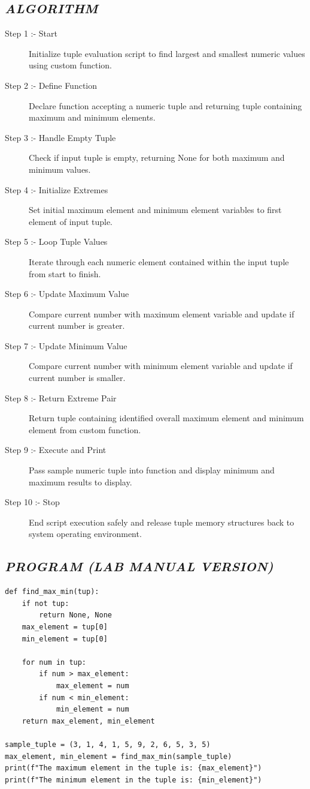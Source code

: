\documentclass[11pt,a4paper]{article}
\begin{document}
\subsection*{\textit{ALGORITHM}}
\begin{description}
  \item[Step 1 :- Start] Initialize tuple evaluation script to find largest and smallest numeric values using custom function.
  \item[Step 2 :- Define Function] Declare function accepting a numeric tuple and returning tuple containing maximum and minimum elements.
  \item[Step 3 :- Handle Empty Tuple] Check if input tuple is empty, returning None for both maximum and minimum values.
  \item[Step 4 :- Initialize Extremes] Set initial maximum element and minimum element variables to first element of input tuple.
  \item[Step 5 :- Loop Tuple Values] Iterate through each numeric element contained within the input tuple from start to finish.
  \item[Step 6 :- Update Maximum Value] Compare current number with maximum element variable and update if current number is greater.
  \item[Step 7 :- Update Minimum Value] Compare current number with minimum element variable and update if current number is smaller.
  \item[Step 8 :- Return Extreme Pair] Return tuple containing identified overall maximum element and minimum element from custom function.
  \item[Step 9 :- Execute and Print] Pass sample numeric tuple into function and display minimum and maximum results to display.
  \item[Step 10 :- Stop] End script execution safely and release tuple memory structures back to system operating environment.
\end{description}

\subsection*{\textit{PROGRAM (LAB MANUAL VERSION)}}
\begin{lstlisting}[style=pythonstyle]
def find_max_min(tup): 
    if not tup: 
        return None, None 
    max_element = tup[0] 
    min_element = tup[0] 
   
    for num in tup: 
        if num > max_element: 
            max_element = num 
        if num < min_element: 
            min_element = num 
    return max_element, min_element 
 
sample_tuple = (3, 1, 4, 1, 5, 9, 2, 6, 5, 3, 5) 
max_element, min_element = find_max_min(sample_tuple) 
print(f"The maximum element in the tuple is: {max_element}") 
print(f"The minimum element in the tuple is: {min_element}")
\end{lstlisting}
\end{document}
